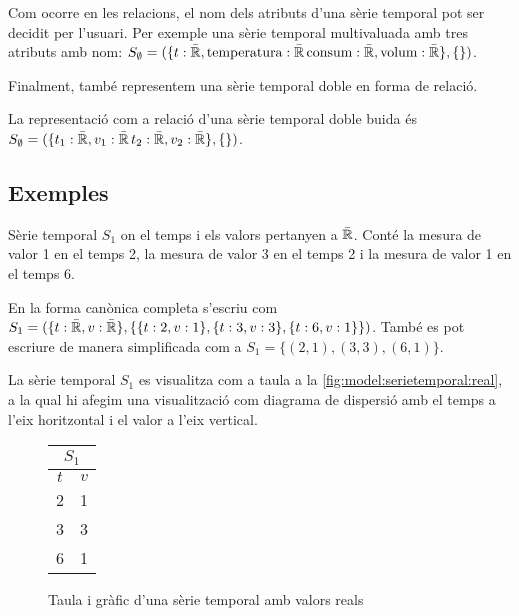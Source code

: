 Com ocorre en les relacions, el nom dels atributs d'una sèrie
temporal pot ser decidit per l'usuari. Per exemple una sèrie temporal
multivaluada amb tres atributs amb nom: $S_{\emptyset} = ( \{t:
\bar{\mathbb{R}{}}, \text{temperatura}: \bar{\mathbb{R}{}}\,
\text{consum}: \bar{\mathbb{R}{}}, \text{volum}: \bar{\mathbb{R}{}}\}, \{
\} )$.


Finalment, també representem una sèrie temporal doble en forma de
relació.
\begin{definition}
  La representació com a relació d'una sèrie temporal doble buida és
  $S_{\emptyset} = ( \{t_1: \bar{\mathbb{R}{}}, v_1: \bar{\mathbb{R}{}}\,
  t_2: \bar{\mathbb{R}{}}, v_2: \bar{\mathbb{R}{}}\}, \{ \} )$.
\end{definition}




\subsection{Exemples}


\begin{example}
  Sèrie temporal $S_1$ on el temps i els valors pertanyen a
  $\bar{\mathbb{R}{}}$. Conté la mesura de valor 1 en el temps 2, la mesura de
  valor 3 en el temps 2 i la mesura de valor 1 en el temps 6.

En la forma canònica completa s'escriu com $S_1 = ( \{t:
\bar{\mathbb{R}{}}, v: \bar{\mathbb{R}{}}\}, \{ \{t:2,v:1\}, \{t:3,v:3\},
\{t:6,v:1\} \} )$. També es pot escriure de manera simplificada com a
$S_1 = \{ (2,1), (3,3), (6,1) \}$.


La sèrie temporal $S_1$ es visualitza com a taula a la
\autoref{fig:model:serietemporal:real}, a la qual hi afegim una
visualització com diagrama de dispersió amb el temps a l'eix
horitzontal i el valor a l'eix vertical.

\begin{figure}[tp]
  \centering
  \begin{tabular}[c]{|c|c|}
    \multicolumn{2}{c}{$S_1$} \\ \hline
    $t$  & $v$ \\ \hline
    2  & 1 \\
    3  & 3 \\
    6  & 1 \\ \hline
  \end{tabular} \qquad
  \caption{Taula i gràfic d'una sèrie temporal amb valors reals}
  \label{fig:model:serietemporal:real}
\end{figure}

\end{example}


